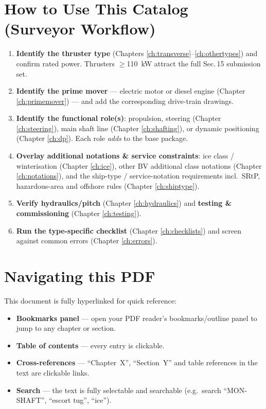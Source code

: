 \documentclass[11pt,a4paper]{report}
\begin{document}
\section*{How to Use This Catalog (Surveyor Workflow)}
\begin{enumerate}[leftmargin=*]
    \item \textbf{Identify the thruster type} (Chapters \ref{ch:transverse}--\ref{ch:othertypes}) and confirm rated power. Thrusters $\geq$110~kW attract the full Sec.\,15 submission set.
    \item \textbf{Identify the prime mover} --- electric motor or diesel engine (Chapter \ref{ch:primemover}) --- and add the corresponding drive-train drawings.
    \item \textbf{Identify the functional role(s)}: propulsion, steering (Chapter \ref{ch:steering}), main shaft line (Chapter \ref{ch:shafting}), or dynamic positioning (Chapter \ref{ch:dp}). Each role \emph{adds} to the base package.
    \item \textbf{Overlay additional notations \& service constraints}: ice class / winterisation (Chapter \ref{ch:ice}), other BV additional class notations (Chapter \ref{ch:notations}), and the ship-type / service-notation requirements incl.\ SRtP, hazardous-area and offshore rules (Chapter \ref{ch:shiptype}).
    \item \textbf{Verify hydraulics/pitch} (Chapter \ref{ch:hydraulics}) and \textbf{testing \& commissioning} (Chapter \ref{ch:testing}).
    \item \textbf{Run the type-specific checklist} (Chapter \ref{ch:checklists}) and screen against common errors (Chapter \ref{ch:errors}).
\end{enumerate}

\section*{Navigating this PDF}
This document is fully hyperlinked for quick reference:
\begin{itemize}[leftmargin=*]
    \item \textbf{Bookmarks panel} --- open your PDF reader's bookmarks/outline panel to jump to any chapter or section.
    \item \textbf{Table of contents} --- every entry is clickable.
    \item \textbf{Cross-references} --- ``Chapter~X'', ``Section~Y'' and table references in the text are clickable links.
    \item \textbf{Search} --- the text is fully selectable and searchable (e.g.\ search ``MON-SHAFT'', ``escort tug'', ``ice'').
\end{itemize}
\end{document}
